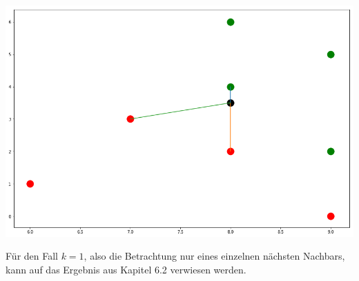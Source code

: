 \documentclass[fontsize=11pt]{scrartcl}
\newenvironment{Figure}
  {\par\medskip\noindent\minipage{\linewidth}}
  {\endminipage\par\medskip}
\begin{document}
\begin{Figure}
\begin{minipage}[b]{.25\linewidth}
                    \end{minipage}
                    \hspace*{.1\linewidth}
                    \begin{minipage}[b]{.25\linewidth}
                        \includegraphics[width=\linewidth]{knn4.png}
                    \end{minipage}
                \end{Figure}
                
                Für den Fall $k=1$, also die Betrachtung nur eines einzelnen nächsten Nachbars, kann auf das Ergebnis aus Kapitel 6.2 verwiesen werden.\par  
              	              
                         
                        
\end{document}
